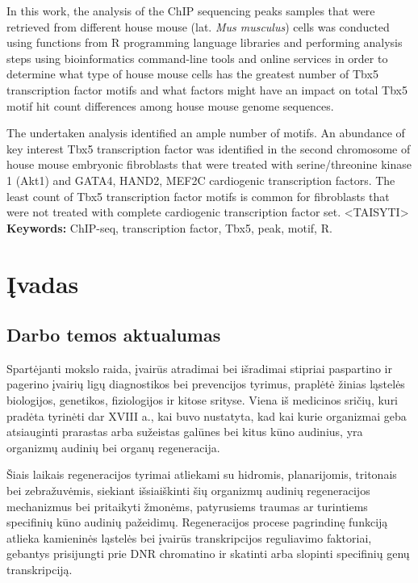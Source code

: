 \documentclass[12pt]{article}
\begin{document}
In this work, the analysis of the ChIP sequencing peaks samples that were
retrieved from different house mouse (lat. \emph{Mus musculus}) cells was
conducted using functions from R programming language libraries and performing
analysis steps using bioinformatics command-line tools and online services
in order to determine what type of house mouse cells has the greatest number
of Tbx5 transcription factor motifs and what factors might have an impact on
total Tbx5 motif hit count differences among house mouse genome sequences.

The undertaken analysis identified an ample number of motifs. An abundance
of key interest Tbx5 transcription factor was identified in the second
chromosome of house mouse embryonic fibroblasts that were treated with
serine/threonine kinase 1 (Akt1) and GATA4, HAND2, MEF2C cardiogenic
transcription factors. The least count of Tbx5 transcription factor motifs
is common for fibroblasts that were not treated with complete cardiogenic
transcription factor set. 
<TAISYTI>
\hfill \break
\textbf{Keywords:} ChIP-seq, transcription factor, Tbx5, peak, motif, R.
\newpage


\section{Įvadas}
\subsection*{Darbo temos aktualumas}

Spartėjanti mokslo raida, įvairūs atradimai bei išradimai stipriai paspartino
ir pagerino įvairių ligų diagnostikos bei prevencijos tyrimus, praplėtė žinias
ląstelės biologijos, genetikos, fiziologijos ir kitose srityse. Viena iš
medicinos sričių, kuri pradėta tyrinėti dar XVIII a., kai buvo nustatyta, kad
kai kurie organizmai geba atsiauginti prarastas arba sužeistas galūnes bei
kitus kūno audinius\cite{REGENERATION}, yra organizmų audinių bei organų
regeneracija.

Šiais laikais regeneracijos tyrimai atliekami su hidromis, planarijomis,
tritonais bei zebražuvėmis\cite{ORGANISMS}, siekiant išsiaiškinti šių organizmų
audinių regeneracijos mechanizmus bei pritaikyti žmonėms, patyrusiems traumas
ar turintiems specifinių kūno audinių pažeidimų. Regeneracijos procese
pagrindinę funkciją atlieka kamieninės ląstelės bei įvairūs transkripcijos
reguliavimo faktoriai, gebantys prisijungti prie DNR chromatino ir skatinti
arba slopinti specifinių genų transkripciją.
\end{document}
